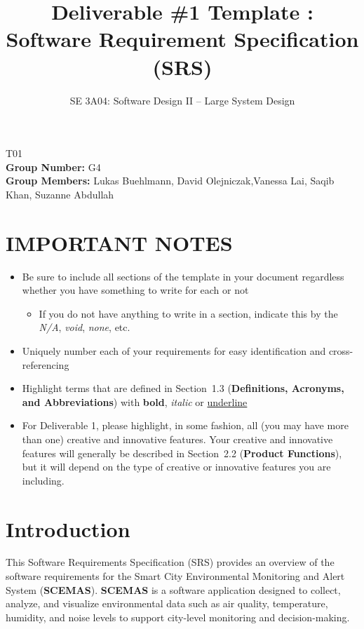 \documentclass[]{article}
\title{Deliverable \#1 Template : Software Requirement Specification (SRS)}
\author{SE 3A04: Software Design II -- Large System Design}
\date{}
\begin{document}
\maketitle	
{} T01\\
{\bf Group Number:} G4 \\
{\bf Group Members:} Lukas Buehlmann, David Olejniczak,Vanessa Lai, Saqib Khan, Suzanne Abdullah

\section*{IMPORTANT NOTES}
\begin{itemize}
	\item Be sure to include all sections of the template in your document regardless whether you have something to write for each or not
	\begin{itemize}
		\item If you do not have anything to write in a section, indicate this by the \emph{N/A}, \emph{void}, \emph{none}, etc.
	\end{itemize}
	\item Uniquely number each of your requirements for easy identification and cross-referencing
	\item Highlight terms that are defined in Section~1.3 (\textbf{Definitions, Acronyms, and Abbreviations}) with \textbf{bold}, \emph{italic} or \underline{underline}
	\item For Deliverable 1, please highlight, in some fashion, all (you may have more than one) creative and innovative features. Your creative and innovative features will generally be described in Section~2.2 (\textbf{Product Functions}), but it will depend on the type of creative or innovative features you are including.
\end{itemize}

\newpage
\section{Introduction}
\label{sec:introduction}
This Software Requirements Specification (SRS) provides an overview of the software requirements for the Smart City Environmental Monitoring and Alert System (\textbf{SCEMAS}). \textbf{SCEMAS} is a software application designed to collect, analyze, and visualize environmental data such as air quality, temperature, humidity, and noise levels to support city-level monitoring and decision-making.
\end{document}
